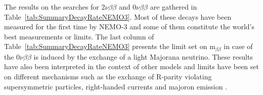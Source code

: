\documentclass[main.tex]{subfiles}
\begin{document}
\bigskip


\NI  The results on the searches for 2$\nu\beta\beta$ and 0$\nu\beta\beta$ are gathered in Table~\ref{tab:SummaryDecayRateNEMO3}. Most of these decays have been measured for the first time by NEMO-3 and some of them constitute the world's best measurements or limits. The last column of Table~\ref{tab:SummaryDecayRateNEMO3} presents the limit set on m$_{\beta\beta}$ in case of the 0$\nu\beta\beta$ is induced by the exchange of a light Majorana neutrino. These results have also been interpreted in the context of other models and limits have been set on different mechanisms such as the exchange of R-parity violating supersymmetric particles, right-handed currents and majoron emission \cite{Arnold2016bed,NEMO3:Nd150,NEMO3:Ca48,NEMO3:Mo100}. 


\bigskip
\end{document}
